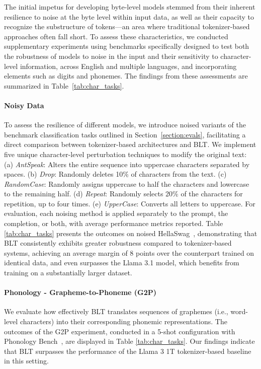 The initial impetus for developing byte-level models stemmed from their inherent resilience to noise at the byte level within input data, as well as their capacity to recognize the substructure of tokens—an area where traditional tokenizer-based approaches often fall short. To assess these characteristics, we conducted supplementary experiments using benchmarks specifically designed to test both the robustness of models to noise in the input and their sensitivity to character-level information, across English and multiple languages, and incorporating elements such as digits and phonemes. The findings from these assessments are summarized in Table~\ref{tab:char_tasks}.

\paragraph{Noisy Data} To assess the resilience of different models, we introduce noised variants of the benchmark classification tasks outlined in Section~\ref{section:evals}, facilitating a direct comparison between tokenizer-based architectures and {\textsc BLT}. We implement five unique character-level perturbation techniques to modify the original text: (a) \textit{AntSpeak}: Alters the entire sequence into uppercase characters separated by spaces. (b) \textit{Drop}: Randomly deletes 10\% of characters from the text. (c) \textit{RandomCase}: Randomly assigns uppercase to half the characters and lowercase to the remaining half. (d) \textit{Repeat}: Randomly selects 20\% of the characters for repetition, up to four times. (e) \textit{UpperCase}: Converts all letters to uppercase. For evaluation, each noising method is applied separately to the prompt, the completion, or both, with average performance metrics reported. Table \ref{tab:char_tasks} presents the outcomes on noised HellaSwag~\citep{Eval_hellaswag}, demonstrating that {\textsc BLT} consistently exhibits greater robustness compared to tokenizer-based systems, achieving an average margin of 8 points over the counterpart trained on identical data, and even surpasses the Llama 3.1 model, which benefits from training on a substantially larger dataset.

\paragraph{Phonology - Grapheme-to-Phoneme (G2P)} We evaluate how effectively {\textsc BLT} translates sequences of graphemes (i.e., word-level characters) into their corresponding phonemic representations. The outcomes of the G2P experiment, conducted in a 5-shot configuration with Phonology Bench~\citep{suvarna2024phonologybench}, are displayed in Table \ref{tab:char_tasks}. Our findings indicate that {\textsc BLT} surpasses the performance of the Llama 3 1T tokenizer-based baseline in this setting.

